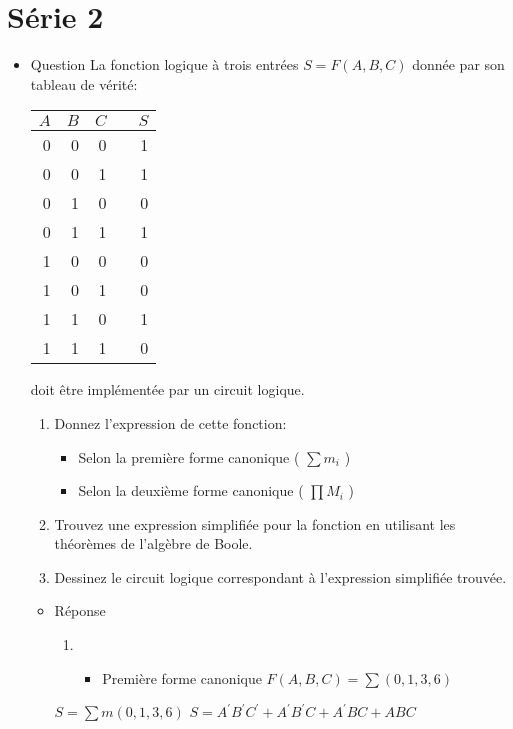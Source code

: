 \documentclass[letter, oneside]{book}
\begin{document}
\section*{Série 2}
\label{sec:org4f2b28e}
\begin{itemize}
\item Question
\label{sec:org0bdddf8}
La fonction logique à trois entrées \(S = F(A,B,C)\) donnée par son
tableau de vérité:
\begin{center}
\begin{tabular}{rrrlr}
\(A\) & \(B\) & \(C\) &  & \(S\)\\[0pt]
\hline
0 & 0 & 0 &  & 1\\[0pt]
0 & 0 & 1 &  & 1\\[0pt]
0 & 1 & 0 &  & 0\\[0pt]
0 & 1 & 1 &  & 1\\[0pt]
1 & 0 & 0 &  & 0\\[0pt]
1 & 0 & 1 &  & 0\\[0pt]
1 & 1 & 0 &  & 1\\[0pt]
1 & 1 & 1 &  & 0\\[0pt]
\end{tabular}
\end{center}

doit être implémentée par un circuit logique.

\begin{enumerate}
\item Donnez l'expression de cette fonction:

\begin{itemize}
\item Selon la première forme canonique ( \(\sum m_i\) )

\item Selon la deuxième forme canonique ( \(\prod M_i\) )
\end{itemize}

\item Trouvez une expression simplifiée pour la fonction en utilisant les
théorèmes de l'algèbre de Boole.

\item Dessinez le circuit logique correspondant à l'expression simplifiée
trouvée.
\end{enumerate}

\begin{itemize}
\item Réponse
\label{sec:org9d20ee8}
\begin{enumerate}
\item \begin{itemize}
\item Première forme canonique  \(F(A,B,C) = \sum (0,1,3,6)\)
\end{itemize}
\end{enumerate}
\(S = \sum m(0, 1, 3, 6)\)
\(S = {A}^{\prime}{B}^{\prime}{C}^{\prime} + {A}^{\prime}{B}^{\prime}C + {A}^{\prime}BC + ABC\)


\end{itemize}
\end{itemize}
\end{document}
